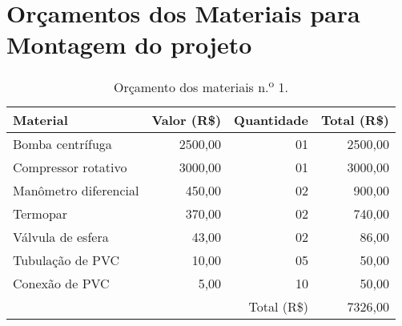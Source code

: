 
\chapter{Orçamentos dos Materiais para Montagem do projeto}\label{cap:apendiceb}

\begin{table}[htb]%
\caption{Orçamento dos materiais n.\textsuperscript{o} 1.}%
\label{tab:tab3}%
\begin{tabularx}{\textwidth}{@{\extracolsep{\fill}}lrrr}%
\toprule
Material              & \multicolumn{1}{c}{Valor (R\$)} & \multicolumn{1}{c}{Quantidade}  & \multicolumn{1}{c}{Total (R\$)} \\ \midrule
Bomba centrífuga      & 2500,00                         & 01                              & 2500,00                         \\
Compressor rotativo   & 3000,00                         & 01                              & 3000,00                         \\
Manômetro diferencial & 450,00                          & 02                              & 900,00                          \\
Termopar              & 370,00                          & 02                              & 740,00                          \\
Válvula de esfera     & 43,00                           & 02                              & 86,00                           \\
Tubulação de PVC      & 10,00                           & 05                              & 50,00                           \\
Conexão de PVC        & 5,00                            & 10                              & 50,00                           \\ \midrule
                      &                                 & \multicolumn{1}{r}{Total (R\$)} & 7326,00                         \\ \bottomrule
\end{tabularx}
\end{table}

